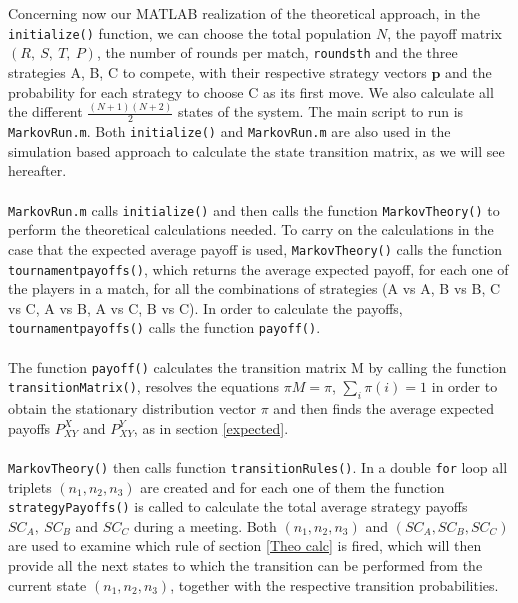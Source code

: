 \documentclass[12pt]{report}
\begin{document}
Concerning now our MATLAB realization of the theoretical approach, in the \texttt{initialize()} function, we can choose the total population $N$, the payoff matrix $(R,\ S,\ T,\ P)$, the number of rounds per match, \texttt{roundsth} and the three strategies A, B, C to compete, with their respective strategy vectors $\mathbf{p}$ and the probability for each strategy to choose C as its first move. We also calculate all the different $\frac{(N+1)(N+2)}{2}$ states of the system. The main script to run is \texttt{MarkovRun.m}. Both \texttt{initialize()} and \texttt{MarkovRun.m} are also used in the simulation based approach to calculate the state transition matrix, as we will see hereafter.
\\\\
\texttt{MarkovRun.m} calls \texttt{initialize()} and then calls the function \texttt{MarkovTheory()} to perform the theoretical calculations needed. To carry on the calculations in the case that the expected average payoff is used, \texttt{MarkovTheory()} calls the function \texttt{tournamentpayoffs()}, which returns the average expected payoff, for each one of the players in a match, for all the combinations of strategies (A vs A, B vs B, C vs C, A vs B, A vs C, B vs C). In order to calculate the payoffs, \texttt{tournamentpayoffs()} calls the function \texttt{payoff()}.
\\\\
The function \texttt{payoff()} calculates the transition matrix M by calling the function 
\\
\texttt{transitionMatrix()}, resolves the equations $\pi M=\pi$, $\sum_{i}\pi(i)=1$ in order to obtain the stationary distribution vector $\pi$ and then finds the average expected payoffs $P_{XY}^X$ and $P_{XY}^Y$, as in section \ref{expected}.
\\\\
\texttt{MarkovTheory()} then calls function \texttt{transitionRules()}. In a double \texttt{for} loop all triplets $(n_1,n_2,n_3)$ are created and for each one of them the function \texttt{strategyPayoffs()} is called to calculate the total average strategy payoffs $SC_A,\ SC_B$ and $SC_C$ during a meeting. Both $(n_1,n_2,n_3)$ and $(SC_A,SC_B,SC_C)$ are used to examine which rule of section \ref{Theo calc} is fired, which will then provide all the next states to which the transition can be performed from the current state $(n_1,n_2,n_3)$, together with the respective transition probabilities.
\end{document}
